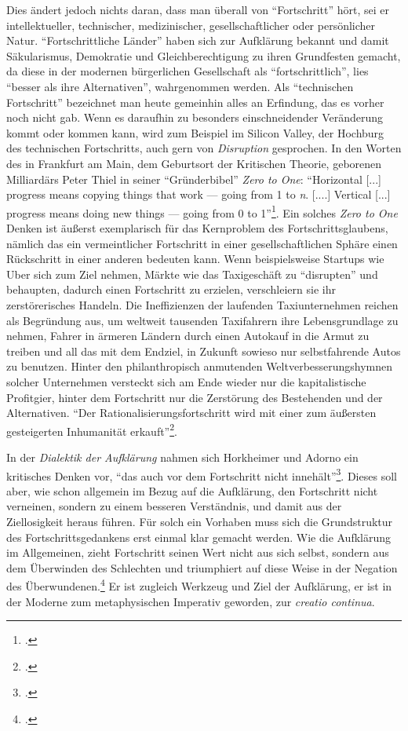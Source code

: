 \documentclass[a4paper, 12pt]{article}
\begin{document}
\begin{onehalfspace}
Dies ändert jedoch nichts daran, dass man überall von "`Fortschritt"' hört, sei er intellektueller, technischer, medizinischer, gesellschaftlicher oder persönlicher Natur. "`Fortschrittliche Länder"' haben sich zur Aufklärung bekannt und damit Säkularismus, Demokratie und Gleichberechtigung zu ihren Grundfesten gemacht, da diese in der modernen bürgerlichen Gesellschaft als "`fortschrittlich"', lies "`besser als ihre Alternativen"', wahrgenommen werden. Als "`technischen Fortschritt"' bezeichnet man heute gemeinhin alles an Erfindung, das es vorher noch nicht gab. Wenn es daraufhin zu besonders einschneidender Veränderung kommt oder kommen kann, wird zum Beispiel im Silicon Valley, der Hochburg des technischen Fortschritts, auch gern von \emph{Disruption} gesprochen. In den Worten des in Frankfurt am Main, dem Geburtsort der Kritischen Theorie, geborenen Milliardärs Peter Thiel in seiner "`Gründerbibel"' \emph{Zero to One}: "`Horizontal [...] progress means copying things that work — going from 1 to \emph{n}. [....] Vertical [...] progress means doing new things — going from 0 to 1"'\footnote{\Cite[Siehe][S. XXX]{thiel}.}. Ein solches \emph{Zero to One} Denken ist äußerst exemplarisch für das Kernproblem des Fortschrittsglaubens, nämlich das ein vermeintlicher Fortschritt in einer gesellschaftlichen Sphäre einen Rückschritt in einer anderen bedeuten kann. Wenn beispielsweise Startups wie Uber sich zum Ziel nehmen, Märkte wie das Taxigeschäft zu "`disrupten"' und behaupten, dadurch einen Fortschritt zu erzielen, verschleiern sie ihr zerstörerisches Handeln. Die Ineffizienzen der laufenden Taxiunternehmen reichen als Begründung aus, um weltweit tausenden Taxifahrern ihre Lebensgrundlage zu nehmen, Fahrer in ärmeren Ländern durch einen Autokauf in die Armut zu treiben und all das mit dem Endziel, in Zukunft sowieso nur selbstfahrende Autos zu benutzen. Hinter den philanthropisch anmutenden Weltverbesserungshymnen solcher Unternehmen versteckt sich am Ende wieder nur die kapitalistische Profitgier, hinter dem Fortschritt nur die Zerstörung des Bestehenden und der Alternativen. "`Der Rationalisierungsfortschritt wird mit einer zum äußersten gesteigerten Inhumanität erkauft"'\footnote{\Cite[Siehe][S. 389]{hetzel2011adorno}.}.

In der \emph{Dialektik der Aufklärung} nahmen sich Horkheimer und Adorno ein kritisches Denken vor, "`das auch vor dem Fortschritt nicht innehält"'\footnote{\Cite[Siehe][S. IX ("`Zur Neuausgabe"')]{dialektik-der-aufklaerung}.}. Dieses soll aber, wie schon allgemein im Bezug auf die Aufklärung, den Fortschritt nicht verneinen, sondern zu einem besseren Verständnis, und damit aus der Ziellosigkeit heraus führen. Für solch ein Vorhaben muss sich die Grundstruktur des Fortschrittsgedankens erst einmal klar gemacht werden. Wie die Aufklärung im Allgemeinen, zieht Fortschritt seinen Wert nicht aus sich selbst, sondern aus dem Überwinden des Schlechten und triumphiert auf diese Weise in der Negation des Überwundenen.\footnote{\Cite[Vgl.][S. 638]{fortschritt}.} Er ist zugleich Werkzeug und Ziel der Aufklärung, er ist in der Moderne zum metaphysischen Imperativ geworden, zur \emph{creatio continua}.  





\end{onehalfspace}
\end{document}
